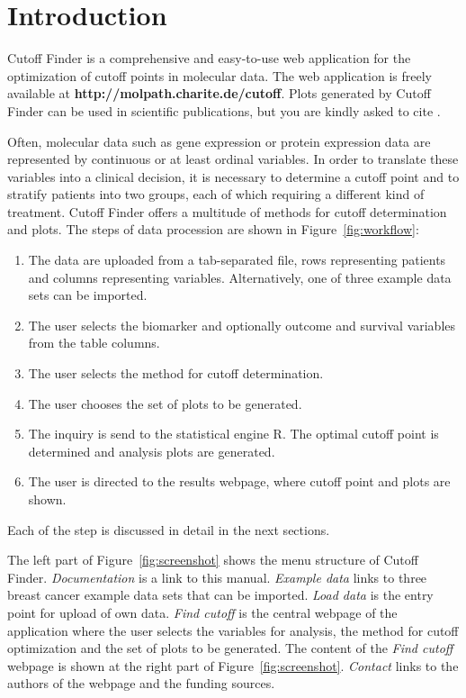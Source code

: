 \documentclass[12pt, a4paper]{article}
\begin{document}
\section{Introduction}
Cutoff Finder is a comprehensive and easy-to-use web application for the optimization of cutoff points in molecular data.
The web application is freely available at \textbf{http://molpath.charite.de/cutoff}.
Plots generated by Cutoff Finder can be used in scientific publications, but you are kindly asked to cite \cite{Budczies2012}.

Often, molecular data such as gene expression or protein expression data are represented by continuous or at least ordinal variables.
In order to translate these variables into a clinical decision, it is necessary to determine a cutoff point and to stratify patients into two groups, each of which requiring a different kind of treatment.
Cutoff Finder offers a multitude of methods for cutoff determination and plots.
The steps of data procession are shown in Figure~\ref{fig:workflow}:

\begin{enumerate}
\item The data are uploaded from a tab-separated file, rows representing patients and columns representing variables.
Alternatively, one of three example data sets can be imported.
\item The user selects the biomarker and optionally outcome and survival variables from the table columns.
\item The user selects the method for cutoff determination.
\item The user chooses the set of plots to be generated.
\item The inquiry is send to the statistical engine R.
The optimal cutoff point is determined and analysis plots are generated.
\item The user is directed to the results webpage, where cutoff point and plots are shown.
\end{enumerate}
Each of the step is discussed in detail in the next sections.

The left part of Figure~\ref{fig:screenshot} shows the menu structure of Cutoff Finder.
\emph{Documentation} is a link to this manual.
\emph{Example data} links to three breast cancer example data sets that can be imported.
\emph{Load data} is the entry point for upload of own data.
\emph{Find cutoff} is the central webpage of the application where the user selects the variables for analysis, the method for cutoff optimization and the set of plots to be generated.
The content of the \emph{Find cutoff} webpage is shown at the right part of Figure~\ref{fig:screenshot}.
\emph{Contact} links to the authors of the webpage and the funding sources.
\end{document}
